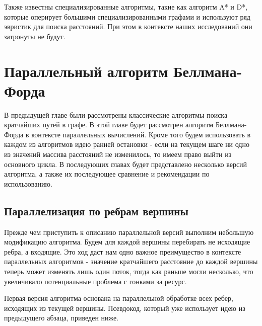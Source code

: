 Также известны специализированные алгоритмы, такие как алгоритм A* и D*, которые оперирует большими специализированными графами и используют ряд эвристик для поиска расстояний. При этом в контексте наших исследований они затронуты не будут.

\FloatBarrier
\section{Параллельный алгоритм Беллмана-Форда}

В предыдущей главе были рассмотрены классические алгоритмы поиска кратчайших путей в графе. В этой главе будет рассмотрен алгоритм Беллмана-Форда в контексте параллельных вычислений. Кроме того будем использовать в каждом из алгоритмов идею ранней остановки - если на текущем шаге ни одно из значений массива расстояний не изменилось, то имеем право выйти из основного цикла. В последующих главах будет представлено несколько версий алгоритма, а также их последующее сравнение и рекомендации по использованию.  

\FloatBarrier
\subsection{Параллелизация по ребрам вершины}

Прежде чем приступить к описанию параллельной версий выполним небольшую модификацию алгоритма. Будем для каждой вершины перебирать не исходящие ребра, а входящие. Это ход даст нам одно важное преимущество в контексте параллельных алгоритмов - значение кратчайшего расстояние до каждой вершины теперь может изменять лишь один поток, тогда как раньше могли несколько, что увеличивало потенциальные проблема с гонками за ресурс.

Первая версия алгоритма основана на параллельной обработке всех ребер, исходящих из текущей вершины. Псевдокод, который уже использует идею из предыдущего абзаца, приведен ниже. 


